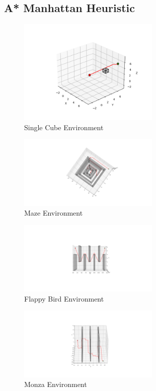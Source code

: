 \documentclass[conference]{IEEEtran}
\begin{document}
\subsection{A* Manhattan Heuristic}
\begin{figure}[H]
    \centering
    \includegraphics[width=0.6\textwidth]{cube_astar_m.png}
    \caption{Single Cube Environment}
    \label{fig:cube_astar_m}
\end{figure}
\begin{figure}[H]
    \centering
    \includegraphics[width=0.6\textwidth]{maze_astar_m.png}
    \caption{Maze Environment}
    \label{fig:maze_astar_m}
\end{figure}
\begin{figure}[H]
    \centering
    \includegraphics[width=0.6\textwidth]{flappy_bird_astar_m.png}
    \caption{Flappy Bird Environment}
    \label{fig:flappy_bird_astar_m}
\end{figure}
\begin{figure}[H]
    \centering
    \includegraphics[width=0.6\textwidth]{monza_astar_m.png}
    \caption{Monza Environment}
    \label{fig:monza_astar_m}
\end{figure}
\end{document}
